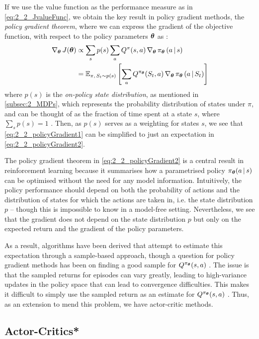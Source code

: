 If we use the value function as the performance measure as in \eqref{eq:2_2_JvalueFunc}, we obtain the key result in policy gradient methods, the \textit{policy gradient theorem}, where we can express the gradient of the objective function, with respect to the policy parameters $\boldsymbol{\theta}$ as \cite{suttonAndBartoBook}:
\begin{align}
    \nabla_{\boldsymbol{\theta}} \, J(\boldsymbol{\theta}) &\propto \sum_s p(s) \sum_a Q^{\pi} (s,a) \, \nabla_{\boldsymbol{\theta}} \, \pi_{\boldsymbol{\theta}} \, (a \, | \, s) \label{eq:2_2_policyGradient1} \\
    &= \mathbb{E}_{\pi,\, S_t \sim p(s)} \left[\sum_a Q^{\pi_{\boldsymbol{\theta}}} (S_t,a) \, \nabla_{\boldsymbol{\theta}} \, \pi_{\boldsymbol{\theta}} \, (a \, | \, S_t) \right] \label{eq:2_2_policyGradient2}
\end{align}
where $p(s)$ is the \textit{on-policy state distribution}, as mentioned in \cref{subsec:2_MDPs}, which represents the probability distribution of states under $\pi$, and can be thought of as the fraction of time spent at a state $s$, where $\sum_s p(s) =1$ \cite{suttonAndBartoBook}.
Then, as $p(s)$ serves as a weighting for states $s$, we see that \eqref{eq:2_2_policyGradient1} can be simplified to just an expectation in \eqref{eq:2_2_policyGradient2}.

The policy gradient theorem in \eqref{eq:2_2_policyGradient2} is a central result in reinforcement learning because it summarises how a parametrised policy $\pi_{\boldsymbol{\theta}} (a \, | \, s)$ can be optimised without the need for any model information.
Intuitively, the policy performance should depend on both the probability of actions and the distribution of states for which the actions are taken in, i.e. the state distribution $p$ -- though this is impossible to know in a model-free setting. Nevertheless, we see that the gradient does not depend on the state distribution $p$ but only on the expected return and the gradient of the policy parameters. 

As a result, algorithms have been derived that attempt to estimate this expectation through a sample-based approach, though a question for policy gradient methods has been on finding a good sample for $Q^{\pi_{\boldsymbol{\theta}}} (s, a)$ \cite{DPG}. The issue is that the sampled returns for episodes can vary greatly, leading to high-variance updates in the policy space that can lead to convergence difficulties. This makes it difficult to simply use the sampled return as an estimate for $Q^{\pi_{\boldsymbol{\theta}}}(s,a)$ \cite{suttonAndBartoBook}. Thus, as an extension to mend this problem, we have actor-critic methods.


\subsection{Actor-Critics*}
\label{subsec:2_actor_critics}

